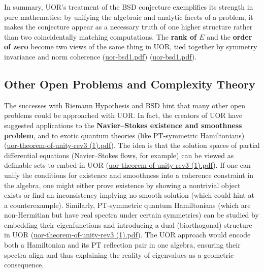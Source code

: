 \documentclass[12pt]{article}
\begin{document}
\medskip

In summary, UOR’s treatment of the BSD conjecture exemplifies its strength in pure mathematics: by unifying the algebraic and analytic facets of a problem, it makes the conjecture appear as a necessary truth of one higher structure rather than two coincidentally matching computations. The \textbf{rank of $E$} and the \textbf{order of zero} become two views of the same thing in UOR, tied together by symmetry invariance and norm coherence (\href{file://file-QX2RAaHV3sY1bCttwB4hkL#:~:text=fixed%20constants,internal%20consistency%3A%20no%20extraneous%20scaling}{uor-bsd1.pdf}) (\href{file://file-QX2RAaHV3sY1bCttwB4hkL#:~:text=match%20at%20L1076%20coherence%20is,the%20norm%20consistency%2C%20hence%20is}{uor-bsd1.pdf}).

\subsection{Other Open Problems and Complexity Theory}

The successes with Riemann Hypothesis and BSD hint that many other open problems could be approached with UOR. In fact, the creators of UOR have suggested applications to the \textbf{Navier--Stokes existence and smoothness problem}, and to exotic quantum theories (like PT-symmetric Hamiltonians) (\href{file://file-CJBWhjR1XERgfPCpnf5UAs#:~:text=Applications%20to%20the%20Riemann%20Hypothesis%2C,the%20scope%20of%20the%20method}{uor-theorem-of-unity-rev3 (1).pdf}). The idea is that the solution spaces of partial differential equations (Navier--Stokes flows, for example) can be viewed as definable sets to embed in UOR (\href{file://file-CJBWhjR1XERgfPCpnf5UAs#:~:text=Examples,symmetric%20Hamiltonians}{uor-theorem-of-unity-rev3 (1).pdf}). If one can unify the conditions for existence and smoothness into a coherence constraint in the algebra, one might either prove existence by showing a nontrivial object exists or find an inconsistency implying no smooth solution (which could hint at a counterexample). Similarly, PT-symmetric quantum Hamiltonians (which are non-Hermitian but have real spectra under certain symmetries) can be studied by embedding their eigenfunctions and introducing a dual (biorthogonal) structure in UOR (\href{file://file-CJBWhjR1XERgfPCpnf5UAs#:~:text=Applications%20to%20the%20Riemann%20Hypothesis%2C,the%20scope%20of%20the%20method}{uor-theorem-of-unity-rev3 (1).pdf}). The UOR approach would encode both a Hamiltonian and its PT reflection pair in one algebra, ensuring their spectra align and thus explaining the reality of eigenvalues as a geometric consequence.
\end{document}
